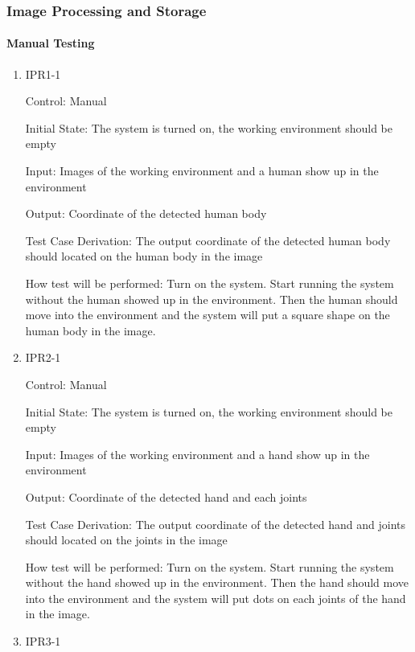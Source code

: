 \documentclass[12pt, titlepage]{article}
\begin{document}
\subsubsection{Image Processing and Storage}
		
\paragraph{Manual Testing}

\begin{enumerate}

\item{IPR1-1\\}

Control: Manual
					
Initial State: The system is turned on, the working environment should be empty
					
Input: Images of the working environment and a human show up in the environment
					
Output: Coordinate of the detected human body

Test Case Derivation: The output coordinate of the detected human body should located on the human body in the image
					
How test will be performed: Turn on the system. Start running the system without the human showed up in the environment. Then the human should move into the environment and the system will put a square shape on the human body in the image.


\item{IPR2-1\\}

Control: Manual
					
Initial State: The system is turned on, the working environment should be empty
					
Input: Images of the working environment and a hand show up in the environment
					
Output: Coordinate of the detected hand and each joints

Test Case Derivation: The output coordinate of the detected hand and joints should located on the joints in the image
					
How test will be performed: Turn on the system. Start running the system without the hand showed up in the environment. Then the hand should move into the environment and the system will put dots on each joints of the hand in the image.

\item{IPR3-1\\}


\end{enumerate}
\end{document}
